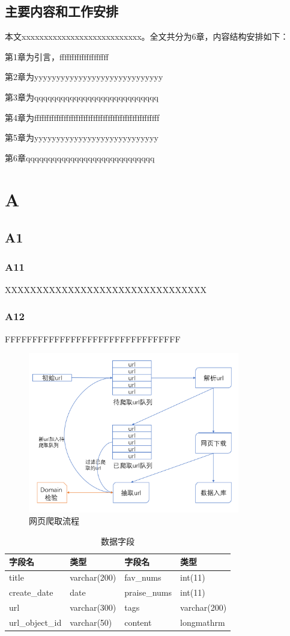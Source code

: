 \documentclass{cqupt}
\begin{document}
\section{主要内容和工作安排}
本文xxxxxxxxxxxxxxxxxxxxxxxxxxx。全文共分为6章，内容结构安排如下：

第1章为引言，ffffffffffffffffffff

第2章为yyyyyyyyyyyyyyyyyyyyyyyyyyyyy

第3章为qqqqqqqqqqqqqqqqqqqqqqqqqqqq

第4章为fffffffffffffffffffffffffffffffffffffffffffffffffff

第5章为yyyyyyyyyyyyyyyyyyyyyyyyyyyy

第6章qqqqqqqqqqqqqqqqqqqqqqqqqqqqq
\chapter{A}
\section{A1}
\subsection{A11}
XXXXXXXXXXXXXXXXXXXXXXXXXXXXXXXX
\subsection{A12}
FFFFFFFFFFFFFFFFFFFFFFFFFFFFFFFF
\begin{figure}[!htbp]
\centering
\includegraphics[height=7cm]{1.png}
\caption{网页爬取流程}\label{f1}
\end{figure}

\begin{table}[!htbp]
\caption{数据字段}\label{t1}
\centering
\begin{tabular}{llll}
\toprule
 字段名 & 类型 &字段名 &类型\\
\midrule
 title &varchar(200)&fav\_nums &int(11)\\
 create\_date & date &praise\_nums& int(11)\\
 url & varchar(300)&tags &varchar(200)\\
 url\_object\_id & varchar(50)&content & longmathrm\\
\bottomrule
\end{tabular}
\end{table}
\end{document}

